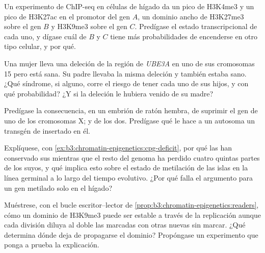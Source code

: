 \begin{exercise}[$\star\star$]\label{exo:b3:chromatin-epigenetics:7}
Un experimento de ChIP-seq en células de hígado da un pico de H3K4me3 y
un pico de H3K27ac en el promotor del gen $A$, un dominio ancho de
H3K27me3 sobre el gen $B$ y H3K9me3 sobre el gen $C$. Predígase el estado
transcripcional de cada uno, y dígase cuál de $B$ y $C$ tiene más
probabilidades de encenderse en otro tipo celular, y por qué.
\end{exercise}

\begin{exercise}[$\star\star$]\label{exo:b3:chromatin-epigenetics:8}
Una mujer lleva una deleción de la región de \emph{UBE3A} en uno de sus
cromosomas 15 pero está sana. Su padre llevaba la misma deleción y
también estaba sano. ¿Qué síndrome, si alguno, corre el riesgo de tener
cada uno de sus hijos, y con qué probabilidad? ¿Y si la deleción le
hubiera venido de su madre?
\end{exercise}

\begin{exercise}[$\star\star$]\label{exo:b3:chromatin-epigenetics:9}
Predígase la consecuencia, en un embrión de ratón hembra, de suprimir el
gen \emph{} de uno de los cromosomas X; y de los dos. Predígase qué
le hace a un autosoma un transgén de \emph{} insertado en él.
\end{exercise}

\begin{exercise}[$\star\star\star$]\label{exo:b3:chromatin-epigenetics:10}
Explíquese, con \cref{ex:b3:chromatin-epigenetics:cpg-deficit}, por qué
las  han conservado sus  mientras que el resto del genoma ha
perdido cuatro quintas partes de los suyos, y qué implica esto sobre el
estado de metilación de las islas en la línea germinal a lo largo del
tiempo evolutivo. ¿Por qué falla el argumento para un gen metilado solo
en el hígado?
\end{exercise}

\begin{exercise}[$\star\star\star$]\label{exo:b3:chromatin-epigenetics:11}
Muéstrese, con el bucle escritor--lector de
\cref{prop:b3:chromatin-epigenetics:readers}, cómo un dominio de H3K9me3
puede ser estable a través de la replicación aunque cada división diluya
al doble las  marcadas con otras nuevas sin marcar. ¿Qué
determina dónde deja de propagarse el dominio? Propóngase un experimento
que ponga a prueba la explicación.
\end{exercise}


